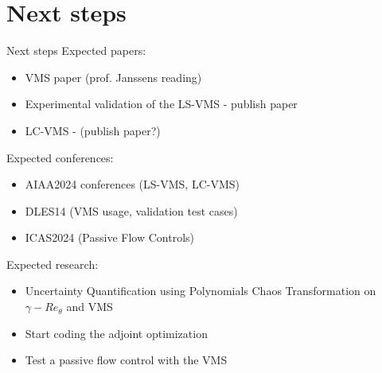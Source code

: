 \documentclass{beamer}
\begin{document}
\section{Next steps}
\begin{frame}{Next steps}
Expected papers:
\begin{itemize}
	\item VMS paper (prof. Janssens reading)
	\item Experimental validation of the LS-VMS - publish paper
	\item LC-VMS - (publish paper?)
\end{itemize}

Expected conferences:
\begin{itemize}
	\item AIAA2024 conferences (LS-VMS, LC-VMS)
	\item DLES14 (VMS usage, validation test cases)
	\item ICAS2024 (Passive Flow Controls)
\end{itemize}


Expected research:
\begin{itemize}
	\item Uncertainty Quantification using Polynomials Chaos Transformation on $\gamma-Re_\theta$ and VMS
	\item Start coding the adjoint optimization
	\item Test a passive flow control with the VMS
\end{itemize}

\end{frame}
\end{document}
